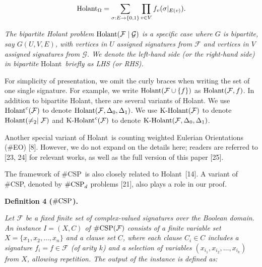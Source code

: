 \documentclass[10pt,a4paper]{article}
\begin{document}
\[\begin{gathered}
\textup{{Holant}}_{\Omega}=\sum_{\sigma:E\rightarrow\{0,1\}}\prod_{v\in V}f_{v}(\sigma|_{E(v)}).
\end{gathered}\]


\emph{The bipartite Holant problem $\textup{{Holant}}(\mathcal{F}\mid\mathcal{G})$ is a specific case where $G$ is bipartite, say $G(U,V,E)$, with vertices in $U$ assigned signatures from $\mathcal{F}$ and vertices in $V$ assigned signatures from $\mathcal{G}$. We denote the left-hand side (or the right-hand side) in bipartite }Holant\emph{ briefly as LHS (or RHS).}\par






For simplicity of presentation, we omit the curly braces when writing the set of one single signature. For example, we write $\textup{{Holant}}(\mathcal{F}\cup\{f\})$ as $\textup{{Holant}}(\mathcal{F},f)$. In addition to bipartite Holant, there are several variants of Holant. We use $\textup{{Holant}}^{c}(\mathcal{F})$ to denote $\textup{{Holant}}(\mathcal{F},\Delta_{0},\Delta_{1})$. We use $\textup{{K-Holant}}(\mathcal{F})$ to denote $\textup{{Holant}}(\neq_{2}\mid\mathcal{F})$ and $\textup{{K-Holant}}^{c}(\mathcal{F})$ to denote $\textup{{K-Holant}}(\mathcal{F},\Delta_{0},\Delta_{1})$.\par




Another special variant of Holant is counting weighted Eulerian Orientations (\#EO) [8]. However, we do not expand on the details here; readers are referred to [23, 24] for relevant works, as well as the full version of this paper [25].\par




The framework of \#CSP is also closely related to Holant [14]. A variant of \#CSP, denoted by $\textup{{\#CSP}}_{d}$ problems [21], also plays a role in our proof.\par





\par\medskip\noindent\textbf{
\textbf{Definition 4}\textbf{ }($\#\textup{{CSP}}$)\textbf{.}
}\par



\emph{Let $\mathcal{F}$ be a fixed finite set of complex-valued signatures over the Boolean domain. An instance $I=(X,C)$ of $\#\textup{{CSP}}(\mathcal{F})$ consists of a finite variable set $X=\{x_{1},x_{2},\ldots,x_{n}\}$ and a clause set $C$, where each clause $C_{i}\in C$ includes a signature $f_{i}=f\in\mathcal{F}$ (of arity $k$) and a selection of variables $(x_{i_{1}},x_{i_{2}},\ldots,x_{i_{k}})$ from $X$, allowing repetition. The output of the instance is defined as:}\par
\end{document}
